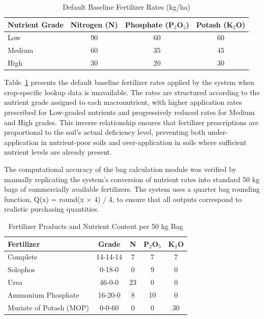 {	\begin{table}[H]
		\centering
		\caption{Default Baseline Fertilizer Rates (kg/ha)}
		\label{tab:baseline_rates}
		\renewcommand{\arraystretch}{1.2}
		\begin{tabular}{lccc}
			\toprule
			Nutrient Grade & Nitrogen (N) & Phosphate (P$_2$O$_5$) & Potash (K$_2$O) \\
			\midrule
			Low & 90 & 60 & 60 \\
			Medium & 60 & 35 & 45 \\
			High & 30 & 20 & 30 \\
			\bottomrule
		\end{tabular}
	\end{table}
	
	Table~\ref{tab:baseline_rates} presents the default baseline fertilizer rates applied by the system when crop-specific lookup data is unavailable. The rates are structured according to the nutrient grade assigned to each macronutrient, with higher application rates prescribed for Low-graded nutrients and progressively reduced rates for Medium and High grades. This inverse relationship ensures that fertilizer prescriptions are proportional to the soil's actual deficiency level, preventing both under-application in nutrient-poor soils and over-application in soils where sufficient nutrient levels are already present.
	
	The computational accuracy of the bag calculation module was verified by manually replicating the system's conversion of nutrient rates into standard 50 kg bags of commercially available fertilizers. The system uses a quarter bag rounding function, Q(x) = round(x × 4) / 4, to ensure that all outputs correspond to realistic purchasing quantities.
	
	\begin{table}[H]
		\centering
		\caption{Fertilizer Products and Nutrient Content per 50 kg Bag}
		\label{tab:fertilizer_products}
		\renewcommand{\arraystretch}{1.2}
		\begin{tabular}{lcccc}
			\toprule
			Fertilizer & Grade & N & P$_2$O$_5$ & K$_2$O \\
			\midrule
			Complete & 14-14-14 & 7 & 7 & 7 \\
			Solophos & 0-18-0 & 0 & 9 & 0 \\
			Urea & 46-0-0 & 23 & 0 & 0 \\
			Ammonium Phosphate & 16-20-0 & 8 & 10 & 0 \\
			Muriate of Potash (MOP) & 0-0-60 & 0 & 0 & 30 \\
			\bottomrule
		\end{tabular}
	\end{table}
	
}
